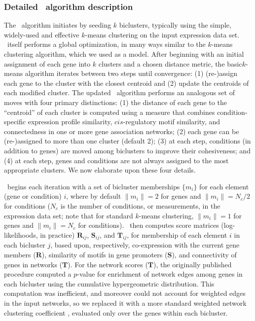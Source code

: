 \subsubsection{Detailed \cm\ algorithm description}

The \cm\ algorithm initiates by seeding $k$ biclusters, typically using the simple, widely-used and effective $k$-means clustering on the input expression data set. \cm\ itself performs a global optimization, in many ways similar to the $k$-means clustering algorithm, which we used as a model. After beginning with an initial assignment of each gene into $k$ clusters and a chosen distance metric, the basic$k$-means algorithm iterates between two steps until convergence: (1) (re-)assign each gene to the cluster with the closest centroid and (2) update the centroids of each modified cluster. The updated \cm\ algorithm performs an analogous set of moves with four primary distinctions: (1) the distance of each gene to the ``centroid'' of each cluster is computed using a measure that combines condition-specific expression profile similarity, $cis$-regulatory motif similarity, and connectedness in one or more gene association networks; (2) each gene can be (re-)assigned to more than one cluster (default 2); (3) at each step, conditions (in addition to genes) are moved among biclusters to improve their cohesiveness; and (4) at each step, genes and conditions are not always assigned to the most appropriate clusters. We now elaborate upon these four details.

\cm\ begins each iteration with a set of bicluster memberships $\{m_i\}$ for each element (gene or condition) $i$, where by default $\|m_i\| = 2$ for genes and $\|m_i\| = N_c/2$ for conditions ($N_c$ is the number of conditions, or measurements, in the expression data set; note that for standard $k$-means clustering, $\|m_i\| = 1$ for genes and $\|m_i\| = N_c$ for conditions). \cm\ then computes score matrices (log-likelihoods, in practice) $\mathbf{R}_{ij}$, $\mathbf{S}_{ij}$, and $\mathbf{T}_{ij}$, for membership of each element $i$ in each bicluster $j$, based upon, respectively, co-expression with the current gene members ($\mathbf{R}$), similarity of motifs in gene promoters ($\mathbf{S}$), and connectivity of genes in networks ($\mathbf{T}$). For the network scores ($\mathbf{T}$), the originally published procedure \cite{reiss_integrated_2006} computed a $p$-value for enrichment of network edges among genes in each bicluster using the cumulative hypergeometric distribution. This computation was inefficient, and moreover could not account for weighted edges in the input networks, so we replaced it with a more standard weighted network clustering coefficient \cite{watts_collective_1998}, evaluated only over the genes within each bicluster.

